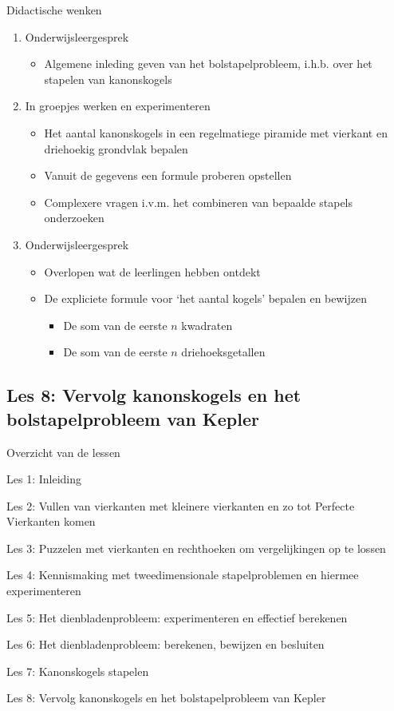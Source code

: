 \documentclass[dutch]{beamer}
\begin{document}
\begin{frame}{Didactische wenken}
\begin{enumerate}
	\item Onderwijsleergesprek
	\begin{itemize}
	\item Algemene inleding geven van het bolstapelprobleem, i.h.b. over het stapelen van kanonskogels	
\end{itemize}
  \item In groepjes werken en experimenteren
  \begin{itemize}
	\item Het aantal kanonskogels in een regelmatiege piramide met vierkant en driehoekig grondvlak bepalen
	\item Vanuit de gegevens een formule proberen opstellen
	\item Complexere vragen i.v.m. het combineren van bepaalde stapels onderzoeken
\end{itemize}
  \item Onderwijsleergesprek
  \begin{itemize}
	  \item Overlopen wat de leerlingen hebben ontdekt
	  \item De expliciete formule voor \textquoteleft het aantal kogels' bepalen en bewijzen
	  \begin{itemize}
	\item De som van de eerste $n$ kwadraten
	\item De som van de eerste $n$ driehoeksgetallen
\end{itemize}
  \end{itemize}
  
\end{enumerate}

\end{frame}


\subsection{Les 8: Vervolg kanonskogels en het bolstapelprobleem van Kepler}
\begin{frame}
{Overzicht van de lessen}
\begin{list}{\quad}{}
\item Les 1: Inleiding
\item Les 2: Vullen van vierkanten met kleinere vierkanten en zo tot Perfecte Vierkanten komen
\item Les 3: Puzzelen met vierkanten en rechthoeken om vergelijkingen op te lossen
\item Les 4: Kennismaking met tweedimensionale stapelproblemen en hiermee experimenteren
\item Les 5: Het dienbladenprobleem: experimenteren en effectief berekenen
\item Les 6: Het dienbladenprobleem: berekenen, bewijzen en besluiten
\item Les 7: Kanonskogels stapelen
\item {\color{blue}Les 8: Vervolg kanonskogels en het bolstapelprobleem van Kepler}
\end{list}
\end{frame}
\end{document}
